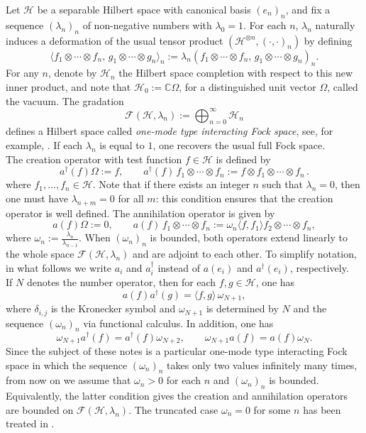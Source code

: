 \documentclass[12pt]{amsart}
\numberwithin{equation}{section}
\def\cf{{\mathcal F}}
\def\ch{{\mathcal H}}
\def\bc{{\mathbb C}}
\def\d{\delta}  \def\D{\Delta}
\def\l{\lambda} \def\L{\Lambda}
\def\om{\omega} \def\Om{\Omega}
\theoremstyle{definition}
\begin{document}
Let $\ch$ be a separable Hilbert space with canonical basis $(e_n)_n$, and fix a sequence $(\l_n)_n$ of non-negative numbers with $\l_0=1$. For each $n$, $\l_n$ naturally induces a deformation of the usual tensor product $(\ch^{\otimes n},(\cdot,\cdot)_n)$ by defining
\[
\langle f_1\otimes \cdots \otimes f_n,\, g_1\otimes \cdots \otimes g_n\rangle_n
:= \l_n (f_1\otimes \cdots \otimes f_n,\, g_1\otimes \cdots \otimes g_n)_n .
\]
For any $n$, denote by $\ch_n$ the Hilbert space completion with respect to this new inner product, and note that $\ch_0:=\bc \Omega$, for a distinguished unit vector $\Omega$, called the vacuum. The gradation
\[
\cf(\ch,\l_n):=\bigoplus_{n=0}^{\infty} \ch_n
\]
defines a Hilbert space called \emph{one-mode type interacting Fock space}, see, for example, \cite{ACL}. If each $\l_n$ is equal to $1$, one recovers the usual full Fock space.\\
The creation operator with test function $f\in\ch$ is defined by
\[
a^\dag(f)\Omega := f, \qquad
a^\dag(f)\, f_1\otimes \cdots \otimes f_n
:= f\otimes f_1\otimes \cdots \otimes f_n\,.
\]
where $f_1,\ldots, f_n\in\ch$.
Note that if there exists an integer $n$ such that $\l_n=0$, then one must have $\l_{n+m}=0$ for all $m$: this condition ensures that the creation operator is well defined. The annihilation operator is given by
\[
a(f)\Omega := 0, \qquad
a(f)\, f_1\otimes \cdots \otimes f_n
:= \om_n \langle f,f_1\rangle f_2\otimes \cdots \otimes f_n ,
\]
where $\om_n := \frac{\l_n}{\l_{n-1}}$. When $(\om_n)_n$ is bounded, both operators extend linearly to the whole space $\cf(\ch,\l_n)$ and are adjoint to each other. To simplify notation, in what follows we write $a_i$ and $a_i^\dag$ instead of $a(e_i)$ and $a^\dag(e_i)$, respectively.\\
If $N$ denotes the number operator, then for each $f,g\in\ch$, one has
\begin{equation}
\label{cr}
a(f) a^{\dag} (g) = \langle f, g\rangle\,\om_{N+1},
\end{equation}
where $\d_{i,j}$ is the Kronecker symbol and $\om_{N+1}$ is determined by $N$ and the sequence $(\om_n)_n$ via functional calculus. In addition, one has
\begin{equation}
\label{cr2}
\om_{N+1} a^\dag(f) = a^\dag(f) \om_{N+2}, \qquad
\om_{N+1} a(f) = a(f) \om_N .
\end{equation}
Since the subject of these notes is a particular one-mode type interacting Fock space in which the sequence $(\om_n)_n$ takes only two values infinitely many times, from now on we assume that $\om_n>0$ for each $n$ and $(\om_n)_n$ is bounded. Equivalently, the latter condition gives the creation and annihilation operators are bounded on $\cf(\ch,\l_n)$. The truncated case $\om_n=0$ for some $n$ has been treated in \cite{CDR}.\\
\end{document}

